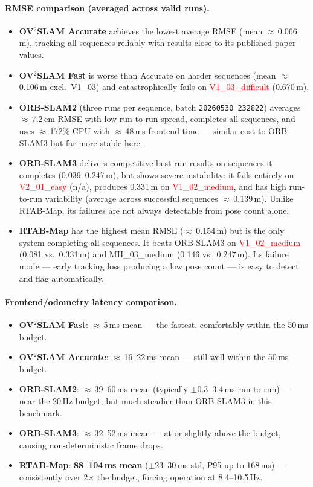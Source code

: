 \documentclass[11pt]{article}
\begin{document}
\paragraph{RMSE comparison (averaged across valid runs).}
\begin{itemize}
    \item \textbf{OV$^2$SLAM Accurate} achieves the lowest average RMSE (mean $\approx$\,0.066\,m), tracking all sequences reliably with results close to its published paper values.
    \item \textbf{OV$^2$SLAM Fast} is worse than Accurate on harder sequences (mean $\approx$\,0.106\,m excl.\ V1\_03) and catastrophically fails on \textcolor{red}{V1\_03\_difficult} (0.670\,m).
    \item \textbf{ORB-SLAM2} (three runs per sequence, batch \texttt{20260530\_232822}) averages $\approx$\,7.2\,cm RMSE with low run-to-run spread, completes all sequences, and uses $\approx$\,172\% CPU with $\approx$\,48\,ms frontend time — similar cost to ORB-SLAM3 but far more stable here.
    \item \textbf{ORB-SLAM3} delivers competitive best-run results on sequences it completes (0.039--0.247\,m), but shows severe instability: it fails entirely on \textcolor{red}{V2\_01\_easy} (n/a), produces 0.331\,m on \textcolor{red}{V1\_02\_medium}, and has high run-to-run variability (average across successful sequences $\approx$\,0.139\,m). Unlike RTAB-Map, its failures are not always detectable from pose count alone.
    \item \textbf{RTAB-Map} has the highest mean RMSE ($\approx$\,0.154\,m) but is the only system completing all sequences. It beats ORB-SLAM3 on \textcolor{red}{V1\_02\_medium} (0.081 vs.\ 0.331\,m) and MH\_03\_medium (0.146 vs.\ 0.247\,m). Its failure mode — early tracking loss producing a low pose count — is easy to detect and flag automatically.
\end{itemize}

\paragraph{Frontend/odometry latency comparison.}
\begin{itemize}
    \item \textbf{OV$^2$SLAM Fast}: $\approx$\,5\,ms mean — the fastest, comfortably within the 50\,ms budget.
    \item \textbf{OV$^2$SLAM Accurate}: $\approx$\,16--22\,ms mean — still well within the 50\,ms budget.
    \item \textbf{ORB-SLAM2}: $\approx$\,39--60\,ms mean (typically $\pm$0.3--3.4\,ms run-to-run) — near the 20\,Hz budget, but much steadier than ORB-SLAM3 in this benchmark.
    \item \textbf{ORB-SLAM3}: $\approx$\,32--52\,ms mean — at or slightly above the budget, causing non-deterministic frame drops.
    \item \textbf{RTAB-Map}: \textbf{88--104\,ms mean} ($\pm$23--30\,ms std, P95 up to 168\,ms) — consistently over 2$\times$ the budget, forcing operation at 8.4--10.5\,Hz.
\end{itemize}
\end{document}
